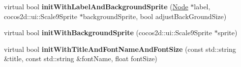 \begin{DoxyCompactItemize}
virtual bool {\bfseries init\+With\+Label\+And\+Background\+Sprite} (\hyperlink{classNode}{Node} $\ast$label, cocos2d\+::ui\+::\+Scale9\+Sprite $\ast$background\+Sprite, bool adjust\+Back\+Ground\+Size)
\item 
\mbox{\label{classControlButton_a43460268e8d9f2eab2079c55e64831fc}} 
virtual bool {\bfseries init\+With\+Background\+Sprite} (cocos2d\+::ui\+::\+Scale9\+Sprite $\ast$sprite)
\item 
\mbox{\label{classControlButton_a4e7cc62b972428ea0867fd361252622a}} 
virtual bool {\bfseries init\+With\+Title\+And\+Font\+Name\+And\+Font\+Size} (const std\+::string \&title, const std\+::string \&font\+Name, float font\+Size)
\end{DoxyCompactItemize}
